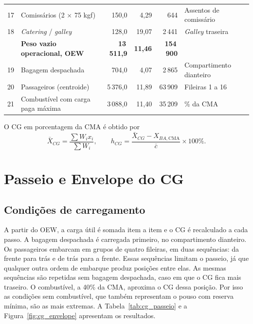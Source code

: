\begin{table}[H]
\begin{tabularx}{\textwidth}{c >{\raggedright\arraybackslash}X r r r >{\raggedright\arraybackslash}X}
    17 & Comissários (2 × 75 kgf) & 150,0 & 4,29 & 644 & Assentos de comissário \\
    18 & \emph{Catering} / \emph{galley} & 128,0 & 19,07 & 2\,441 & \emph{Galley} traseira \\
    \midrule
     & \textbf{Peso vazio operacional, OEW} & \textbf{13\,511,9} & \textbf{11,46} & \textbf{154\,900} & \\
    \midrule
    19 & Bagagem despachada & 704,0 & 4,07 & 2\,865 & Compartimento dianteiro \\
    20 & Passageiros (centroide) & 5\,376,0 & 11,89 & 63\,909 & Fileiras 1 a 16 \\
    21 & Combustível com carga paga máxima & 3\,088,0 & 11,40 & 35\,209 & 40\% da CMA \\
    \bottomrule
  \end{tabularx}
\end{table}

O CG em porcentagem da CMA é obtido por
\begin{equation}
\bar{X}_{CG} = \frac{\sum W_i x_i}{\sum W_i}, \qquad
h_{CG} = \frac{\bar{X}_{CG} - X_{BA,\text{CMA}}}{\bar{c}} \times 100\%.
\label{eq:cg}
\end{equation}

\section{Passeio e Envelope do CG}
\label{sec:cg_envelope}

\subsection{Condições de carregamento}

A partir do OEW, a carga útil é somada item a item e o CG é recalculado a cada passo. A bagagem despachada é carregada primeiro, no compartimento dianteiro. Os passageiros embarcam em grupos de quatro fileiras, em duas sequências: da frente para trás e de trás para a frente. Essas sequências limitam o passeio, já que qualquer outra ordem de embarque produz posições entre elas. As mesmas sequências são repetidas sem bagagem despachada, caso em que o CG fica mais traseiro. O combustível, a 40\% da CMA, aproxima o CG dessa posição. Por isso as condições sem combustível, que também representam o pouso com reserva mínima, são as mais extremas. A Tabela~\ref{tab:cg_passeio} e a Figura~\ref{fig:cg_envelope} apresentam os resultados.

